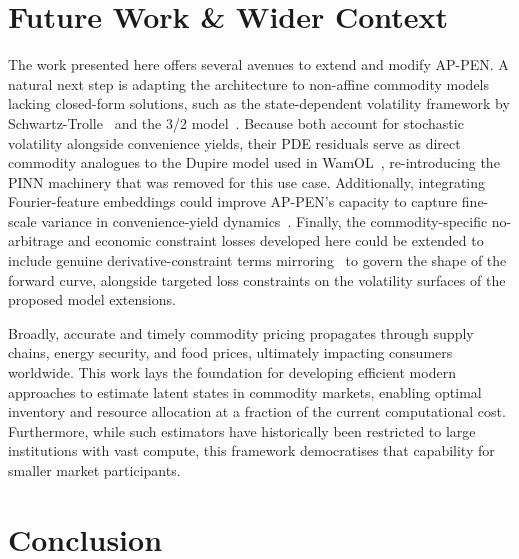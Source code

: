 \documentclass[11pt, a4paper]{article}
\begin{document}
\section{Future Work \& Wider Context}
\label{sec:future_work_conetxt}
The work presented here offers several avenues to extend and modify AP-PEN. A natural next step is adapting the architecture to non-affine commodity models lacking closed-form solutions, such as the state-dependent volatility framework by Schwartz-Trolle~\cite{chen2017pricing} and the 3/2 model~\cite{kouarfate2021explicit}. Because both account for stochastic volatility alongside convenience yields, their PDE residuals serve as direct commodity analogues to the Dupire model used in WamOL~\cite{Hoshisashi2024Whack-a-moleSurface, dupire1994pricing}, re-introducing the PINN machinery that was removed for this use case. Additionally, integrating Fourier-feature embeddings could improve AP-PEN's capacity to capture fine-scale variance in convenience-yield dynamics~\cite{tancik2020fourier}. Finally, the commodity-specific no-arbitrage and economic constraint losses developed here could be extended to include genuine derivative-constraint terms mirroring~\cite{Hoshisashi2024Physics-InformedPDEs} to govern the shape of the forward curve, alongside targeted loss constraints on the volatility surfaces of the proposed model extensions.

Broadly, accurate and timely commodity pricing propagates through supply chains, energy security, and food prices, ultimately impacting consumers worldwide. This work lays the foundation for developing efficient modern approaches to estimate latent states in commodity markets, enabling optimal inventory and resource allocation at a fraction of the current computational cost. Furthermore, while such estimators have historically been restricted to large institutions with vast compute, this framework democratises that capability for smaller market participants.


\section{Conclusion}
\label{sec:conclusion}
\end{document}
